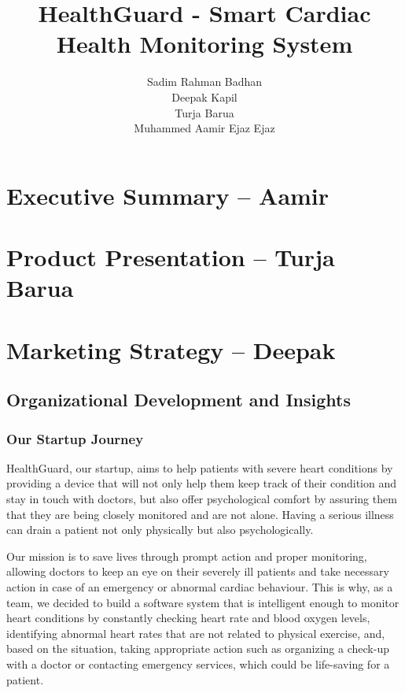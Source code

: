 \documentclass{article}
\title{\centering HealthGuard - Smart Cardiac Health Monitoring System}
\author{
    Sadim Rahman Badhan \\
    Deepak Kapil \\
    Turja Barua \\
    Muhammed Aamir Ejaz Ejaz
}
\date{}
\begin{document}
\maketitle

\section*{Executive Summary – Aamir}


\section*{Product Presentation – Turja Barua}


\section*{Marketing Strategy – Deepak}



\subsection*{\centering Organizational Development and Insights}
\subsubsection*{\centering Our Startup Journey}

HealthGuard, our startup, aims to help patients with severe heart conditions by providing a device that will not only help them keep track of their condition and stay in touch with doctors, but also offer psychological comfort by assuring them that they are being closely monitored and are not alone. Having a serious illness can drain a patient not only physically but also psychologically.

Our mission is to save lives through prompt action and proper monitoring, allowing doctors to keep an eye on their severely ill patients and take necessary action in case of an emergency or abnormal cardiac behaviour. This is why, as a team, we decided to build a software system that is intelligent enough to monitor heart conditions by constantly checking heart rate and blood oxygen levels, identifying abnormal heart rates that are not related to physical exercise, and, based on the situation, taking appropriate action such as organizing a check-up with a doctor or contacting emergency services, which could be life-saving for a patient.
\end{document}
